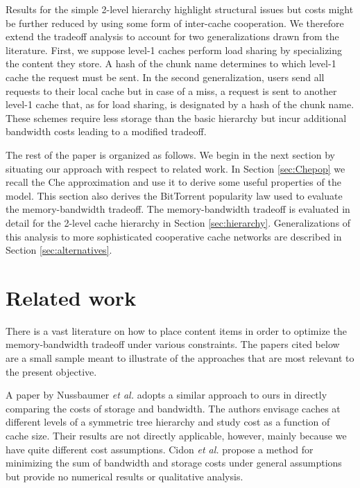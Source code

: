 \documentclass [11pt]{article}
\def\etal{{\em et al. }}
\begin{document}
Results for the simple 2-level hierarchy highlight structural issues but costs might be further reduced by using some form of inter-cache cooperation. We therefore extend the tradeoff analysis to account for two generalizations drawn from the literature. First, we suppose level-1 caches perform load sharing by specializing the content they store. A hash of the chunk name determines to which level-1 cache the request must be sent. In the second generalization, users send all requests to their local cache but in case of a miss, a request is sent to another level-1 cache that, as for load sharing, is designated by a hash of the chunk name.  
These schemes require less storage than the basic hierarchy but incur additional bandwidth costs leading to a modified tradeoff. 

The rest of the paper is organized as follows. We begin in the next section by situating our approach with respect to related work. In Section \ref{sec:Chepop} we recall the Che approximation and use it to derive some useful properties of the model. This section also derives the BitTorrent popularity law used to evaluate the memory-bandwidth tradeoff. The memory-bandwidth tradeoff is evaluated in detail for the 2-level cache hierarchy in Section \ref{sec:hierarchy}. Generalizations of this analysis to more sophisticated cooperative cache networks are described in Section \ref{sec:alternatives}.


 
\section{Related work}
\label{sec:related}
There is a vast literature on how to place content items in order to optimize the memory-bandwidth tradeoff under various constraints. The papers cited below are a small sample meant to illustrate of the approaches that are most relevant to the present objective.

A paper by Nussbaumer \etal \cite{NPSS95} adopts a similar approach to ours in directly comparing the costs of storage and bandwidth. The authors envisage caches at different levels of a symmetric tree hierarchy and study cost as a function of cache size. Their results are not directly applicable, however, mainly because we have quite different cost assumptions. Cidon \etal  \cite{CKS2002 } propose a method for minimizing the sum of bandwidth and storage costs under general assumptions but provide no numerical results or qualitative analysis. 
\end{document}
